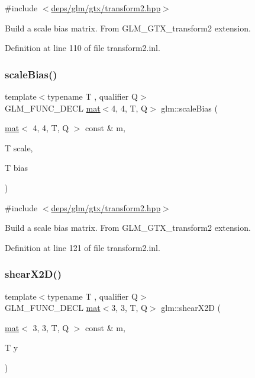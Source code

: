 {\ttfamily \#include $<$\hyperlink{transform2_8hpp}{deps/glm/gtx/transform2.\+hpp}$>$}

Build a scale bias matrix. From G\+L\+M\+\_\+\+G\+T\+X\+\_\+transform2 extension. 

Definition at line 110 of file transform2.\+inl.

\mbox{\label{group__gtx__transform2_gae2bdd91a76759fecfbaef97e3020aa8e}} 
\subsubsection{\texorpdfstring{scale\+Bias()}{scaleBias()}\hspace{0.1cm}{\footnotesize\ttfamily [2/2]}}
{\footnotesize\ttfamily template$<$typename T , qualifier Q$>$ \\
G\+L\+M\+\_\+\+F\+U\+N\+C\+\_\+\+D\+E\+CL \hyperlink{structglm_1_1mat}{mat}$<$4, 4, T, Q$>$ glm\+::scale\+Bias (\begin{DoxyParamCaption}\item[{\hyperlink{structglm_1_1mat}{mat}$<$ 4, 4, T, Q $>$ const \&}]{m,  }\item[{T}]{scale,  }\item[{T}]{bias }\end{DoxyParamCaption})}



{\ttfamily \#include $<$\hyperlink{transform2_8hpp}{deps/glm/gtx/transform2.\+hpp}$>$}

Build a scale bias matrix. From G\+L\+M\+\_\+\+G\+T\+X\+\_\+transform2 extension. 

Definition at line 121 of file transform2.\+inl.

\mbox{\label{group__gtx__transform2_gabf714b8a358181572b32a45555f71948}} 
\subsubsection{\texorpdfstring{shear\+X2\+D()}{shearX2D()}}
{\footnotesize\ttfamily template$<$typename T , qualifier Q$>$ \\
G\+L\+M\+\_\+\+F\+U\+N\+C\+\_\+\+D\+E\+CL \hyperlink{structglm_1_1mat}{mat}$<$3, 3, T, Q$>$ glm\+::shear\+X2D (\begin{DoxyParamCaption}\item[{\hyperlink{structglm_1_1mat}{mat}$<$ 3, 3, T, Q $>$ const \&}]{m,  }\item[{T}]{y }\end{DoxyParamCaption})}



